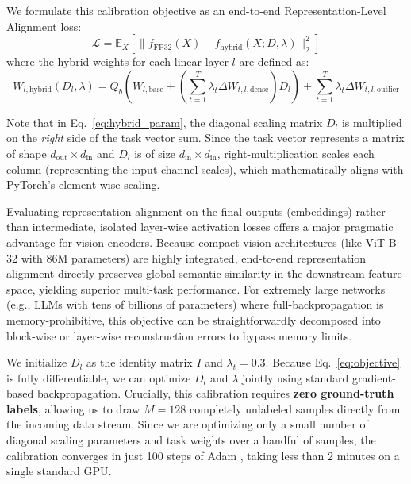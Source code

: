 We formulate this calibration objective as an end-to-end Representation-Level Alignment loss:
\begin{equation}
\mathcal{L} = \mathbb{E}_{X} \left[ \| f_{\text{FP32}}(X) - f_{\text{hybrid}}(X; D, \lambda) \|_2^2 \right]
\label{eq:objective}
\end{equation}
where the hybrid weights for each linear layer $l$ are defined as:
\begin{equation}
W_{l, \text{hybrid}}(D_l, \lambda) = Q_b\left(W_{l, \text{base}} + \left( \sum_{t=1}^T \lambda_t \Delta W_{t, l, \text{dense}} \right) D_l \right) + \sum_{t=1}^T \lambda_t \Delta W_{t, l, \text{outlier}}
\label{eq:hybrid_param}
\end{equation}

Note that in Eq.~\ref{eq:hybrid_param}, the diagonal scaling matrix $D_l$ is multiplied on the \emph{right} side of the task vector sum. Since the task vector represents a matrix of shape $d_{\text{out}} \times d_{\text{in}}$ and $D_l$ is of size $d_{\text{in}} \times d_{\text{in}}$, right-multiplication scales each column (representing the input channel scales), which mathematically aligns with PyTorch's element-wise scaling.

Evaluating representation alignment on the final outputs (embeddings) rather than intermediate, isolated layer-wise activation losses offers a major pragmatic advantage for vision encoders. Because compact vision architectures (like ViT-B-32 with 86M parameters) are highly integrated, end-to-end representation alignment directly preserves global semantic similarity in the downstream feature space, yielding superior multi-task performance. For extremely large networks (e.g., LLMs with tens of billions of parameters) where full-backpropagation is memory-prohibitive, this objective can be straightforwardly decomposed into block-wise or layer-wise reconstruction errors to bypass memory limits.

We initialize $D_l$ as the identity matrix $I$ and $\lambda_t = 0.3$. Because Eq.~\ref{eq:objective} is fully differentiable, we can optimize $D_l$ and $\lambda$ jointly using standard gradient-based backpropagation. Crucially, this calibration requires \textbf{zero ground-truth labels}, allowing us to draw $M = 128$ completely unlabeled samples directly from the incoming data stream. Since we are optimizing only a small number of diagonal scaling parameters and task weights over a handful of samples, the calibration converges in just 100 steps of Adam \cite{kingma2014adam}, taking less than 2 minutes on a single standard GPU.

